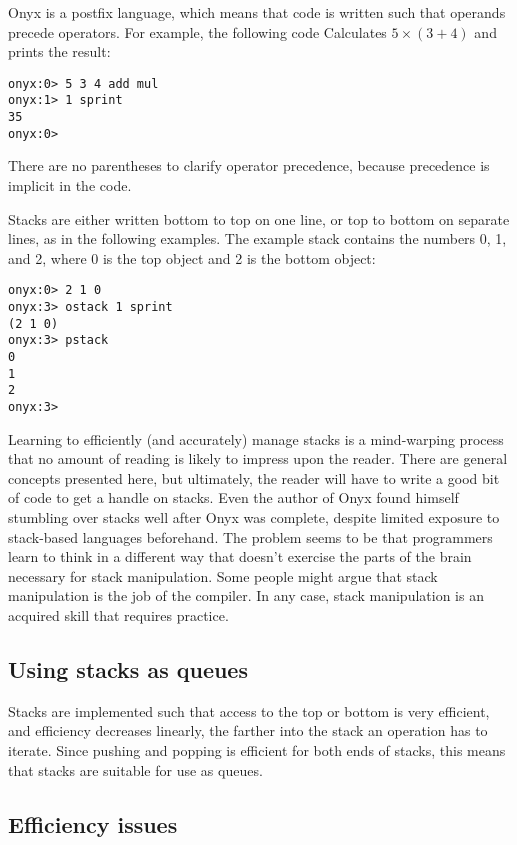 Onyx is a postfix language, which means that code is written such that operands
precede operators.  For example, the following code Calculates $5 \times (3 +
4)$ and prints the result:

\begin{verbatim}
onyx:0> 5 3 4 add mul
onyx:1> 1 sprint
35
onyx:0>
\end{verbatim}

There are no parentheses to clarify operator precedence, because precedence is
implicit in the code.

Stacks are either written bottom to top on one line, or top to bottom on
separate lines, as in the following examples.  The example stack contains the
numbers 0, 1, and 2, where 0 is the top object and 2 is the bottom object:

\begin{verbatim}
onyx:0> 2 1 0
onyx:3> ostack 1 sprint
(2 1 0)
onyx:3> pstack
0
1
2
onyx:3>
\end{verbatim}

Learning to efficiently (and accurately) manage stacks is a mind-warping process
that no amount of reading is likely to impress upon the reader.  There are
general concepts presented here, but ultimately, the reader will have to write a
good bit of code to get a handle on stacks.  Even the author of Onyx found
himself stumbling over stacks well after Onyx was complete, despite limited
exposure to stack-based languages beforehand.  The problem seems to be that
programmers learn to think in a different way that doesn't exercise the parts of
the brain necessary for stack manipulation.  Some people might argue that stack
manipulation is the job of the compiler.  In any case, stack manipulation is an
acquired skill that requires practice.

\subsection{Using stacks as queues}

Stacks are implemented such that access to the top or bottom is very efficient,
and efficiency decreases linearly, the farther into the stack an operation has
to iterate.  Since pushing and popping is efficient for both ends of stacks,
this means that stacks are suitable for use as queues.

\subsection{Efficiency issues}

